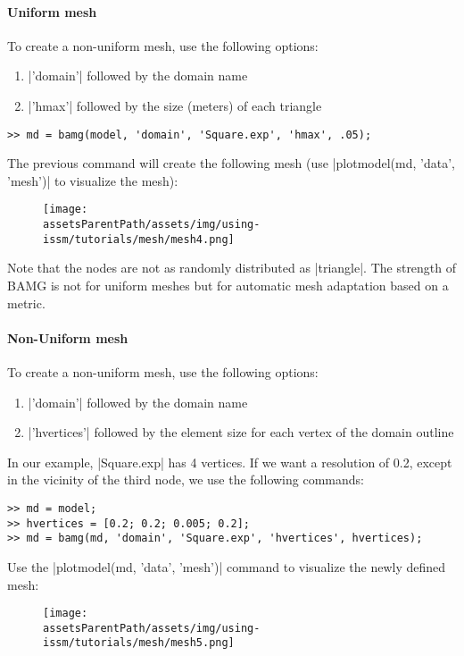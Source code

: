 \paragraph{Uniform mesh}%
To create a non-uniform mesh, use the following options:
\begin{enumerate}
	\item \lstinlinebg|'domain'| followed by the domain name
	\item \lstinlinebg|'hmax'| followed by the size (meters) of each triangle
\end{enumerate}
\begin{lstlisting}
>> md = bamg(model, 'domain', 'Square.exp', 'hmax', .05);
\end{lstlisting}
The previous command will create the following mesh (use \lstinlinebg|plotmodel(md, 'data', 'mesh')| to visualize the mesh):
\begin{figure}[H]
	\begin{center}
		\texttt{[image: \\assetsParentPath/assets/img/using-issm/tutorials/mesh/mesh4.png]}
	\end{center}
\end{figure}
Note that the nodes are not as randomly distributed as \lstinlinebg|triangle|. The strength of BAMG is not for uniform meshes but for automatic mesh adaptation based on a metric.

\paragraph{Non-Uniform mesh}%
To create a non-uniform mesh, use the following options:
\begin{enumerate}
	\item \lstinlinebg|'domain'| followed by the domain name
	\item \lstinlinebg|'hvertices'| followed by the element size for each vertex of the domain outline
\end{enumerate}
In our example, \lstinlinebg|Square.exp| has 4 vertices. If we want a resolution of 0.2, except in the vicinity of the third node, we use the following commands:
\begin{lstlisting}
>> md = model;
>> hvertices = [0.2; 0.2; 0.005; 0.2];
>> md = bamg(md, 'domain', 'Square.exp', 'hvertices', hvertices);
\end{lstlisting}
Use the \lstinlinebg|plotmodel(md, 'data', 'mesh')| command to visualize the newly defined mesh:
\begin{figure}[H]
	\begin{center}
		\texttt{[image: \\assetsParentPath/assets/img/using-issm/tutorials/mesh/mesh5.png]}
	\end{center}
\end{figure}

